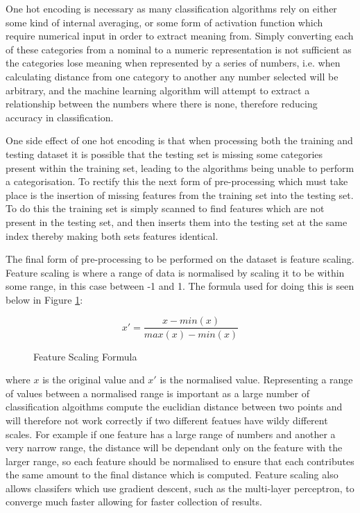 \documentclass[12pt,a4paper]{article}
\begin{document}


One hot encoding is necessary as many classification algorithms rely on either some kind of internal averaging, or some form of activation function which require numerical input in order to extract meaning from. Simply converting each of these categories from a nominal to a numeric representation is not sufficient as the categories lose meaning when represented by a series of numbers, i.e. when calculating distance from one category to another any number selected will be arbitrary, and the machine learning algorithm will attempt to extract a relationship between the numbers where there is none, therefore reducing accuracy in classification. 

One side effect of one hot encoding is that when processing both the training and testing dataset it is possible that the testing set is missing some categories present within the training set, leading to the algorithms being unable to perform a categorisation. To rectify this the next form of pre-processing which must take place is the insertion of missing features from the training set into the testing set. To do this the training set is simply scanned to find features which are not present in the testing set, and then inserts them into the testing set at the same index thereby making both sets features identical.

The final form of pre-processing to be performed on the dataset is feature scaling. Feature scaling is where a range of data is normalised by scaling it to be within some range, in this case between -1 and 1. The formula used for doing this is seen below in Figure \ref{scale}:
\begin{figure}[H]
	\[ x' = \frac{x - min(x)}{max(x) - min(x)} \] 
\caption{Feature Scaling Formula}
\label{scale}
\end{figure}
where $ x $ is the original value and $ x' $ is the normalised value. Representing a range of values between a normalised range is important as a large number of classification algoithms compute the euclidian distance between two points and will therefore not work correctly if two different featues have wildy different scales. For example if one feature has a large range of numbers and another a very narrow range, the distance will be dependant only on the feature with the larger range, so each feature should be normalised to ensure that each contributes the same amount to the final distance which is computed. Feature scaling also allows classifers which use gradient descent, such as the multi-layer perceptron, to converge much faster allowing for faster collection of results.
\end{document}
